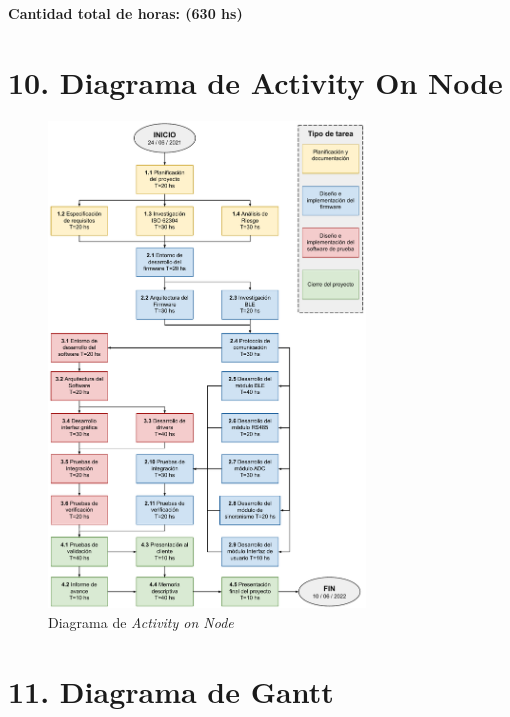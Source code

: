 \documentclass[
11pt, %
codirector, %
]{charter}
\begin{document}
\textbf{Cantidad total de horas: (630 hs)}

\newpage
\section{10. Diagrama de Activity On Node}
\label{sec:AoN}



\begin{figure}[htpb]
\centering 
\includegraphics[width=0.75\textwidth]{./Figuras/DASNActivityonNode.pdf}
\caption{Diagrama de \textit{Activity on Node}}
\label{fig:AoN}
\end{figure}


\section{11. Diagrama de Gantt}
\label{sec:gantt}
\end{document}
